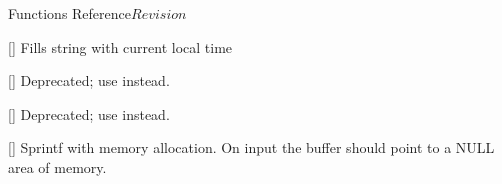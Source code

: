 \begin{cactuspart}{ Functions Reference}{}{$Revision$}
\begin{Lentry}
\item[\code{Util\_CurrentTime}] [\pageref{Util-CurrentTime}]
  Fills string with current local time

\item[\code{Util\_snprintf}]
     [\pageref{Util-snprintf}]
Deprecated; use  instead.

\item[\code{Util\_vsnprintf}]
     [\pageref{Util-vsnprintf}]
Deprecated; use  instead.

\item[\code{Util\_asprintf}]
     [\pageref{Util-asprintf}]
Sprintf with memory allocation.  On input
the buffer should point to a NULL area of memory.














\end{Lentry}
\end{cactuspart}
